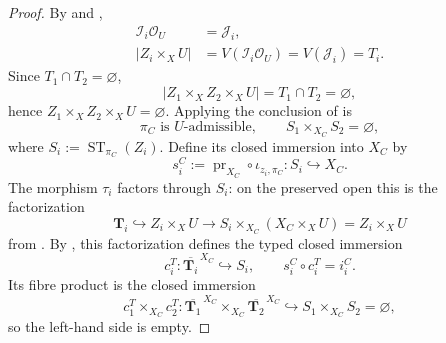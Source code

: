 \begin{proof}
  By  and
  ,
  \[
  \begin{aligned}
    \mathcal I_i\mathcal O_U&=\mathcal J_i,\\
    |Z_i\times_XU|
      &=V(\mathcal I_i\mathcal O_U)
       =V(\mathcal J_i)=T_i.
  \end{aligned}
  \]
  Since $T_1\cap T_2=\varnothing$,
  \[
    |Z_1\times_XZ_2\times_XU|
      =T_1\cap T_2=\varnothing,
  \]
  hence $Z_1\times_XZ_2\times_XU=\varnothing$.  Applying
  the conclusion of  is
  \[
    \pi_C\text{ is }U\text{-admissible},
    \qquad
    S_1\times_{X_C}S_2=\varnothing,
  \]
  where $S_i:=\operatorname{ST}_{\pi_C}(Z_i)$.  Define its closed immersion
  into $X_C$ by
  \[
    s_i^C:=\operatorname{pr}_{X_C}\circ\iota_{z_i,\pi_C}
      \colon S_i\hookrightarrow X_C.
  \]
  The morphism $\tau_i$ factors through $S_i$: on the preserved open this is
  the factorization
  \[
    \mathbf T_i\hookrightarrow Z_i\times_XU
      \longrightarrow S_i\times_{X_C}(X_C\times_XU)=Z_i\times_XU
  \]
  from .  By
  , this factorization defines the
  typed closed immersion
  \[
    c_i^T\colon
      \overline{\mathbf T_i}^{\,X_C}\hookrightarrow S_i,
    \qquad
    s_i^C\circ c_i^T=i_i^C.
  \]
  Its fibre product is the closed immersion
  \[
    c_1^T\times_{X_C}c_2^T\colon
      \overline{\mathbf T_1}^{\,X_C}
        \times_{X_C}\overline{\mathbf T_2}^{\,X_C}
      \hookrightarrow S_1\times_{X_C}S_2=\varnothing,
  \]
  so the left-hand side is empty.
\end{proof}

